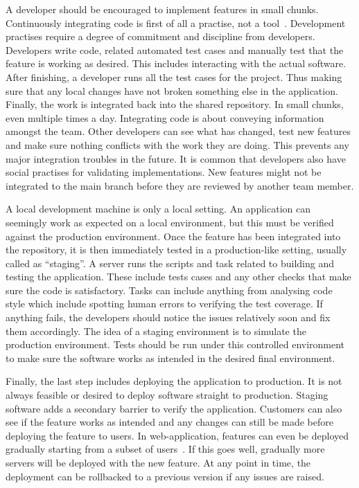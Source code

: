 \documentclass[english]{tktltiki2}
\begin{document}
A developer should be encouraged to implement features in small chunks. Continuously integrating code is first of all a practise, not a tool~\cite{HF11}. Development practises require a degree of commitment and discipline from developers. Developers write code, related automated test cases and manually test that the feature is working as desired. This includes interacting with the actual software. After finishing, a developer runs all the test cases for the project. Thus making sure that any local changes have not broken something else in the application. Finally, the work is integrated back into the shared repository. In small chunks, even multiple times a day. Integrating code is about conveying information amongst the team. Other developers can see what has changed, test new features and make sure nothing conflicts with the work they are doing. This prevents any major integration troubles in the future. It is common that developers also have social practises for validating implementations. New features might not be integrated to the main branch before they are reviewed by another team member.

A local development machine is only a local setting. An application can seemingly work as expected on a local environment, but this must be verified against the production environment. Once the feature has been integrated into the repository, it is then immediately tested in a production-like setting, usually called as “staging”. A server runs the scripts and task related to building and testing the application. These include tests cases and any other checks that make sure the code is satisfactory. Tasks can include anything from analysing code style which include spotting human errors to verifying the test coverage. If anything fails, the developers should notice the issues relatively soon and fix them accordingly. The idea of a staging environment is to simulate the production environment. Tests should be run under this controlled environment to make sure the software works as intended in the desired final environment.

Finally, the last step includes deploying the application to production. It is not always feasible or desired to deploy software straight to production. Staging software adds a secondary barrier to verify the application. Customers can also see if the feature works as intended and any changes can still be made before deploying the feature to users. In web-application, features can even be deployed gradually starting from a subset of users~\cite{Bos12}. If this goes well, gradually more servers will be deployed with the new feature. At any point in time, the deployment can be rollbacked to a previous version if any issues are raised.
\end{document}
